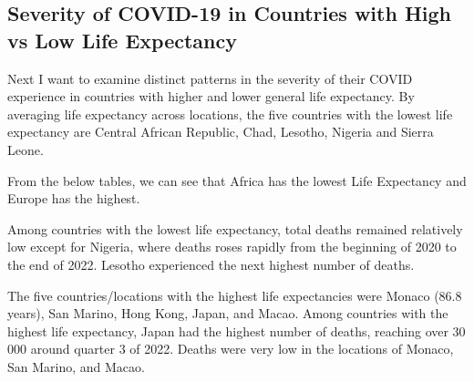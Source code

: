 \documentclass[11pt,preprint, authoryear]{elsarticle}
\numberwithin{equation}{section}
\numberwithin{figure}{section}
\numberwithin{table}{section}
\begin{document}
\hypertarget{severity-of-covid-19-in-countries-with-high-vs-low-life-expectancy}{%
\subsection{Severity of COVID-19 in Countries with High vs Low Life
Expectancy}\label{severity-of-covid-19-in-countries-with-high-vs-low-life-expectancy}}

Next I want to examine distinct patterns in the severity of their COVID
experience in countries with higher and lower general life expectancy.
By averaging life expectancy across locations, the five countries with
the lowest life expectancy are Central African Republic, Chad, Lesotho,
Nigeria and Sierra Leone.

From the below tables, we can see that Africa has the lowest Life
Expectancy and Europe has the highest.

Among countries with the lowest life expectancy, total deaths remained
relatively low except for Nigeria, where deaths roses rapidly from the
beginning of 2020 to the end of 2022. Lesotho experienced the next
highest number of deaths.

The five countries/locations with the highest life expectancies were
Monaco (86.8 years), San Marino, Hong Kong, Japan, and Macao. Among
countries with the highest life expectancy, Japan had the highest number
of deaths, reaching over 30 000 around quarter 3 of 2022. Deaths were
very low in the locations of Monaco, San Marino, and Macao.
\end{document}
